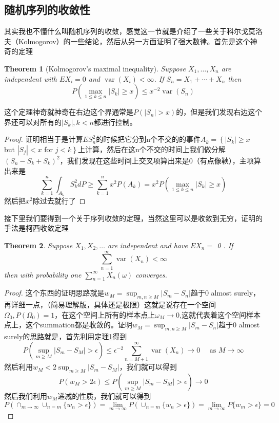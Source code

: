 \documentclass{article}
\newtheorem{theorem}{Theorem}[section]
\newtheorem*{proof}{Proof}
\begin{document}
\subsection{随机序列的收敛性}
其实我也不懂什么叫随机序列的收敛，感觉这一节就是介绍了一些关于科尔戈莫洛夫（Kolmogorov）的一些结论，然后从另一方面证明了强大数律。首先是这个神奇的定理
\begin{theorem}[Kolmogorov's maximal inequality]
	\label{maxbound}
Suppose $X_1, \ldots, X_n$ are independent with $E X_i=0$ and $\operatorname{var}\left(X_i\right)<\infty$. If $S_n=X_1+\cdots+X_n$ then
	$$
	P\left(\max _{1 \leq k \leq n}\left|S_k\right| \geq x\right) \leq x^{-2} \operatorname{var}\left(S_n\right)
	$$
\end{theorem}
这个定理神奇就神奇在右边这个界通常是$P(|S_n|>x)$的，但是我们发现右边这个界还可以对所有的$|S_k|,k<n$都进行控制。
\begin{proof}
	证明相当于是计算$ES_n^2$的时候把它分到n个不交的的事件$A_k=\left\{\left|S_k\right| \geq x\right.$ but $\left|S_j\right|<x$ for $\left.j<k\right\}$上计算，然后在这n个不交的时间上我们做分解$(S_n-S_k+S_k)^2$，我们发现在这些时间上交叉项算出来是0（有点像鞅），主项算出来是
	$$
	\sum_{k=1}^n \int_{A_k} S_k^2 d P \geq \sum_{k=1}^n x^2 P\left(A_k\right)=x^2 P\left(\max _{1 \leq k \leq n}\left|S_k\right| \geq x\right)
	$$
	然后把$x^2$除过去就行了
\end{proof}
接下里我们要得到一个关于序列收敛的定理，当然这里可以是收敛到无穷，证明的手法是柯西收敛定理
\begin{theorem}
	Suppose $X_1, X_2, \ldots$ are independent and have $E X_n=$ 0 . If
	$$
	\sum_{n=1}^{\infty} \operatorname{var}\left(X_n\right)<\infty
	$$
	then with probability one $\sum_{n=1}^{\infty} X_n(\omega)$ converges.
\end{theorem}
\begin{proof}
	这个东西的证明思路就是$w_M=\sup _{m, n \geq M}\left|S_m-S_n\right|$趋于0 almost surely，再详细一点，（简易理解版，具体还是极限）这就是说存在一个空间$\Omega_0,P(\Omega_0)=1$，在这个空间上所有的样本点上$\omega_M\to 0$,这就代表着这个空间样本点上，这个summation都是收敛的。证明$w_M=\sup _{m, n \geq M}\left|S_m-S_n\right|$趋于0 almost surely的思路就是，首先利用定理\ref{maxbound}得到
	$$
	P\left(\sup _{m \geq M}\left|S_m-S_M\right|>\epsilon\right) \leq \epsilon^{-2} \sum_{n=M+1}^{\infty} \operatorname{var}\left(X_n\right) \rightarrow 0 \quad \text { as } M \rightarrow \infty
	$$
	然后利用$w_M<2\sup _{m \geq M}\left|S_m-S_M\right|$，我们就可以得到
	$$
	P\left(w_M>2 \epsilon\right) \leq P\left(\sup _{m \geq M}\left|S_m-S_M\right|>\epsilon\right) \rightarrow 0
	$$
	然后我们利用$w_M$递减的性质，我们就可以得到
	$$
	P(\cap_{m\to\infty}\cup_{n=m}\{w_n>\epsilon\})=\lim_{m\to\infty}P(\cup_{n=m}\{w_n>\epsilon\})=\lim_{m\to\infty}P\{w_m>\epsilon\}=0
	$$
\end{proof}
\end{document}
